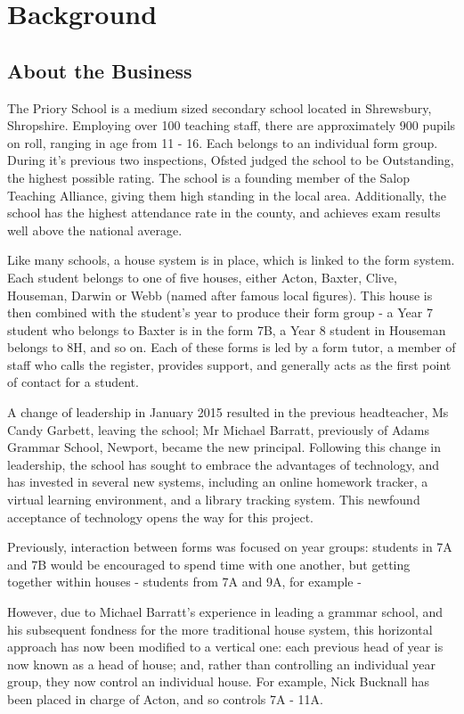 \section{Background}

\subsection{About the Business}

The Priory School is a medium sized secondary school located in Shrewsbury, Shropshire. Employing over 100 teaching staff, there are approximately 900 pupils on roll, ranging in age from 11 - 16. Each belongs to an individual form group. During it's previous two inspections, Ofsted judged the school to be Outstanding, the highest possible rating. The school is a founding member of the Salop Teaching Alliance, giving them high standing in the local area. Additionally, the school has the highest attendance rate in the county, and achieves exam results well above the national average. 

Like many schools, a house system is in place, which is linked to the form system. Each student belongs to one of five houses, either Acton, Baxter, Clive, Houseman, Darwin or Webb (named after famous local figures). This house is then combined with the student's year to produce their form group - a Year 7 student who belongs to Baxter is in the form 7B, a Year 8 student in Houseman belongs to 8H, and so on. Each of these forms is led by a form tutor, a member of staff who calls the register, provides support, and generally acts as the first point of contact for a student.

A change of leadership in January 2015 resulted in the previous headteacher, Ms Candy Garbett, leaving the school; Mr Michael Barratt, previously of Adams Grammar School, Newport, became the new principal. Following this change in leadership, the school has sought to embrace the advantages of technology, and has invested in several new systems, including an online homework tracker, a virtual learning environment, and a library tracking system. This newfound acceptance of technology opens the way for this project.

Previously, interaction between forms was focused on year groups: students in 7A and 7B would be encouraged to spend time with one another, but getting together within houses - students from 7A and 9A, for example - 

However, due to Michael Barratt's experience in leading a grammar school, and his subsequent fondness for the more traditional house system, this horizontal approach has now been modified to a vertical one: each previous head of year is now known as a head of house; and, rather than controlling an individual year group, they now control an individual house. For example, Nick Bucknall has been placed in charge of Acton, and so controls 7A - 11A.

